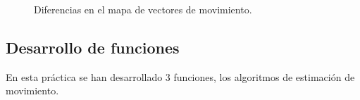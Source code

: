 \documentclass[a4paper,12pt]{report}
\begin{document}
\begin{figure}[!tbp]
  \centering
  \hfill
  \hfill
  \caption{Diferencias en el mapa de vectores de movimiento.}
  \label{arrow}
\end{figure}
\subsection{Desarrollo de funciones}

En esta práctica se han desarrollado 3 funciones, los algoritmos de estimación de movimiento.\\
\end{document}
